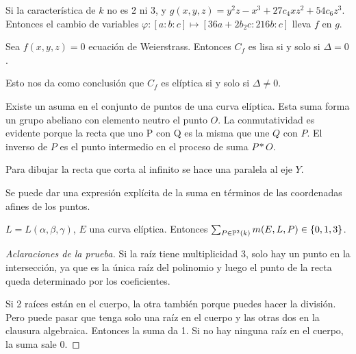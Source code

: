 \documentclass[CR.tex]{subfiles}
\begin{document}
\begin{lemma}[en la página 26]
Si la característica de $k$ no es 2 ni 3, y $g(x,y,z)=y^2z-x^3+27c_4xz^2+54c_6z^3$. Entonces el cambio de variables $\varphi:[a:b:c]\mapsto [36a+2b_2c:216b:c]$ lleva $f$ en $g$. 
\end{lemma}

\begin{prop}[2.3.3]
Sea $f(x,y,z)=0$ ecuación de Weierstrass. Entonces $C_f$ es lisa si y solo si $\Delta=0$.
\end{prop}

Esto nos da como conclusión que $C_f$ es elíptica si y solo si $\Delta\neq 0$.

\begin{defi}
Existe un asuma en el conjunto de puntos de una curva elíptica. Esta suma forma un grupo abeliano con elemento neutro el punto $O$. La conmutatividad es evidente porque la recta que uno P con Q es la misma que une $Q$ con $P$. El inverso de $P$ es el punto intermedio en el proceso de suma $P*O$. 
\end{defi}

Para dibujar la recta que corta al infinito se hace una paralela al eje $Y$.



\begin{prop}
Se puede dar una expresión explícita de la suma en términos de las coordenadas afines de los puntos. 
\end{prop}



\begin{lemma}[Satz 2.3.8]
$L=L(\alpha,\beta,\gamma)$, $E$ una curva elíptica. Entonces $\sum_{P\in\mathbb{P}^2(k)}m(E,L,P)\in\{0,1,3\}$.
\end{lemma}
\begin{proof}[Aclaraciones de la prueba]
Si la raíz tiene multiplicidad 3, solo hay un punto en la intersección, ya que es la única raíz del polinomio y luego el punto de la recta queda determinado por los coeficientes. 


Si 2 raíces están en el cuerpo, la otra también porque puedes hacer la división. Pero puede pasar que tenga solo una raíz en el cuerpo y las otras dos en la clausura algebraica. Entonces la suma da 1. Si no hay ninguna raíz en el cuerpo, la suma sale 0. 
\end{proof}
\end{document}
